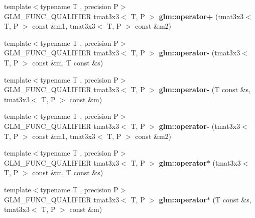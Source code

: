 \begin{DoxyCompactItemize}
\item 
\hypertarget{namespaceglm_a356ed6fa88f4ee6805c31b33ad9e4cd7}{{\footnotesize template$<$typename T , precision P$>$ }\\G\-L\-M\-\_\-\-F\-U\-N\-C\-\_\-\-Q\-U\-A\-L\-I\-F\-I\-E\-R tmat3x3$<$ T, P $>$ {\bfseries glm\-::operator+} (tmat3x3$<$ T, P $>$ const \&m1, tmat3x3$<$ T, P $>$ const \&m2)}\label{namespaceglm_a356ed6fa88f4ee6805c31b33ad9e4cd7}

\item 
\hypertarget{namespaceglm_a8fe341a49041df12c3bb638cf4393de1}{{\footnotesize template$<$typename T , precision P$>$ }\\G\-L\-M\-\_\-\-F\-U\-N\-C\-\_\-\-Q\-U\-A\-L\-I\-F\-I\-E\-R tmat3x3$<$ T, P $>$ {\bfseries glm\-::operator-\/} (tmat3x3$<$ T, P $>$ const \&m, T const \&s)}\label{namespaceglm_a8fe341a49041df12c3bb638cf4393de1}

\item 
\hypertarget{namespaceglm_ab8b4a9c6d56bba75263467d6eaaa67a0}{{\footnotesize template$<$typename T , precision P$>$ }\\G\-L\-M\-\_\-\-F\-U\-N\-C\-\_\-\-Q\-U\-A\-L\-I\-F\-I\-E\-R tmat3x3$<$ T, P $>$ {\bfseries glm\-::operator-\/} (T const \&s, tmat3x3$<$ T, P $>$ const \&m)}\label{namespaceglm_ab8b4a9c6d56bba75263467d6eaaa67a0}

\item 
\hypertarget{namespaceglm_aca1e701a0f64422be768b08ce5891ae0}{{\footnotesize template$<$typename T , precision P$>$ }\\G\-L\-M\-\_\-\-F\-U\-N\-C\-\_\-\-Q\-U\-A\-L\-I\-F\-I\-E\-R tmat3x3$<$ T, P $>$ {\bfseries glm\-::operator-\/} (tmat3x3$<$ T, P $>$ const \&m1, tmat3x3$<$ T, P $>$ const \&m2)}\label{namespaceglm_aca1e701a0f64422be768b08ce5891ae0}

\item 
\hypertarget{namespaceglm_af6b4a4108004c9cb558cc38403c34598}{{\footnotesize template$<$typename T , precision P$>$ }\\G\-L\-M\-\_\-\-F\-U\-N\-C\-\_\-\-Q\-U\-A\-L\-I\-F\-I\-E\-R tmat3x3$<$ T, P $>$ {\bfseries glm\-::operator$\ast$} (tmat3x3$<$ T, P $>$ const \&m, T const \&s)}\label{namespaceglm_af6b4a4108004c9cb558cc38403c34598}

\item 
\hypertarget{namespaceglm_ae05b82e27e29a3c38c3489379a30500b}{{\footnotesize template$<$typename T , precision P$>$ }\\G\-L\-M\-\_\-\-F\-U\-N\-C\-\_\-\-Q\-U\-A\-L\-I\-F\-I\-E\-R tmat3x3$<$ T, P $>$ {\bfseries glm\-::operator$\ast$} (T const \&s, tmat3x3$<$ T, P $>$ const \&m)}\label{namespaceglm_ae05b82e27e29a3c38c3489379a30500b}


\end{DoxyCompactItemize}
